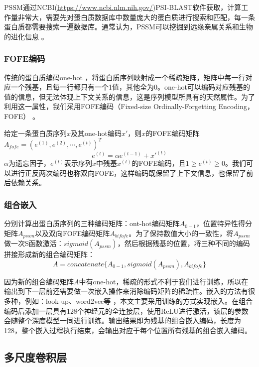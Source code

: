 \documentclass[a4paper, tikz]{article}
\begin{document}
PSSM通过NCBI(\url{https://www.ncbi.nlm.nih.gov/})PSI-BLAST软件获取，计算工作量非常大，需要先对蛋白质数据库中数量庞大的蛋白质进行搜索和匹配，每一条蛋白质都需要搜索一遍数据库。通常认为，PSSM可以挖掘到远缘亲属关系和生物的进化信息\citep{lin2016must} 。

\subsubsection{FOFE编码}
传统的蛋白质编码one-hot\citep{zheng2017protein} ，将蛋白质序列映射成一个稀疏矩阵，矩阵中每一行对应一个残基，且每一行都只有一个1值，其他全为0。one-hot可以编码对应残基的值的信息，但无法体现上下文关系的信息，这是序列模型所具有的天然属性。为了利用这一属性，我们采用FOFE编码（Fixed-size Ordinally-Forgetting Encoding，FOFE）\citep{zhang2015fixed} 。

给定一条蛋白质序列$x$及其one-hot编码$x'$，则$x$的FOFE编码矩阵$A_{fofe}=(e^{(1)},e^{(2)},\cdots,e^{(t)})^T$
\begin{equation}
	e^{(t)} = \alpha e^{(t-1)}+x'^{(t)}	
\end{equation}
$\alpha$为遗忘因子，$e^{(t)}$表示序列$x$中残基$x^{(t)}$的FOFE编码，且$1\ge e^{(t)}\ge 0$。我们可以进行正反两次编码也称双向FOFE，这样编码既保留了上下文信息，也保留了前后依赖关系。

\subsubsection{组合嵌入}
分别计算出蛋白质序列的三种编码矩阵：ont-hot编码矩阵$A_{0-1}$，位置特异性得分矩阵$A_{pssm}$以及双向FOFE编码矩阵$A_{bifofe}$。为了保持数值大小的一致性，将$A_{pssm}$做一次S函数激活：$sigmoid(A_{pssm})$，然后根据残基的位置，将三种不同的编码拼接形成新的组合编码矩阵：
\begin{equation}
	A = concatenate\{A_{0-1},sigmoid(A_{pssm}),A_{bifofe}\}
\end{equation}

因为新的组合编码矩阵$A$中有one-hot，稀疏的形式不利于我们进行训练，所以在输出到下一层前还需要做一次嵌入操作来消除编码矩阵的稀疏性。嵌入的方法有很多种，例如：look-up、word2vec等\citep{goldberg2014word2vec} ，本文主要采用训练的方式实现嵌入。在组合编码后添加一层具有128个神经元的全连接层，使用ReLU进行激活，该层的参数会随整个深度模型一同进行训练。输出结果即为残基的组合嵌入编码，长度为128，整个嵌入过程执行结束，会输出对应于每个位置所有残基的组合嵌入编码。

\subsection{多尺度卷积层}
\end{document}
